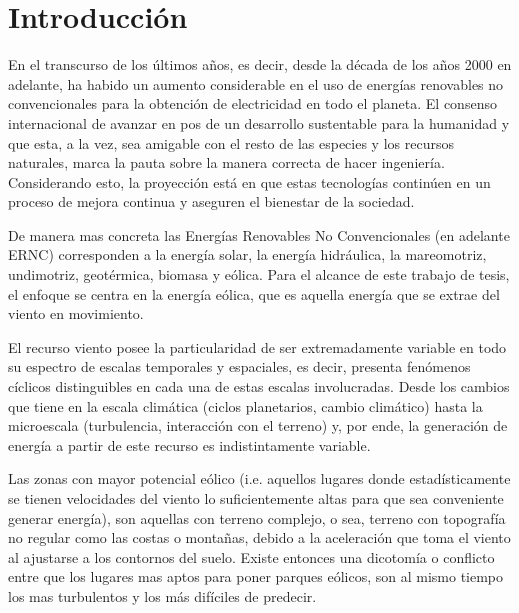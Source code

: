 \chapter{Introducción}
En el transcurso de los últimos años, es decir, desde la década de los años 2000 en adelante, ha habido un aumento considerable en el uso de energías renovables no convencionales para la obtención de electricidad en todo el planeta. El consenso internacional de avanzar en pos de un desarrollo sustentable para la humanidad y que esta, a la vez, sea amigable con el resto de las especies y los recursos naturales, marca la pauta sobre la manera correcta de hacer ingeniería. Considerando esto, la proyección está en que estas tecnologías continúen en un proceso de mejora continua y aseguren el bienestar de la sociedad.

De manera mas concreta las Energías Renovables No Convencionales (en adelante ERNC) corresponden a la energía solar, la energía hidráulica, la mareomotriz, undimotriz, geotérmica, biomasa y eólica. Para el alcance de este trabajo de tesis, el enfoque se centra en la energía eólica, que es aquella energía que se extrae del viento en movimiento.

El recurso viento posee la particularidad de ser extremadamente variable en todo su espectro de escalas temporales y espaciales, es decir, presenta fenómenos cíclicos distinguibles en cada una de estas escalas involucradas. Desde los cambios que tiene en la escala climática (ciclos planetarios, cambio climático) hasta la microescala (turbulencia, interacción con el terreno) y, por ende, la generación de energía a partir de este recurso es indistintamente variable. 
 


Las zonas con mayor potencial eólico (i.e. aquellos lugares donde estadísticamente se tienen velocidades del viento lo suficientemente altas para que sea conveniente generar energía), son aquellas con terreno complejo, o sea, terreno con topografía no regular como las costas o montañas, debido a la aceleración que toma el viento al ajustarse a los contornos del suelo. Existe entonces una dicotomía o conflicto entre que los lugares mas aptos para poner parques eólicos, son al mismo tiempo los mas turbulentos y los más difíciles de predecir.

